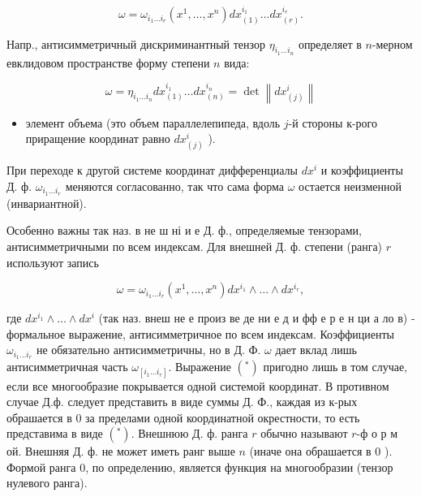 \documentclass[10pt]{article}
\begin{document}
\[

\omega=\omega_{i_{1} \ldots i_{r}}\left(x^{1}, \ldots, x^{n}\right) d x_{(1)}^{i_{1}} \ldots d x_{(r)}^{i_{r}} .

\]



Напр., антисимметричный дискриминантный тензор $\eta_{i_{1} \ldots i_{n}}$ определяет в $n$-мерном евклидовом пространстве форму степени $n$ вида:



\[

\omega=\eta_{i_{1} \ldots i_{n}} d x_{(1)}^{i_{1}} \ldots d x_{(n)}^{i_{n}}=\operatorname{det}\left\|d x_{(j)}^{i}\right\|

\]



\begin{itemize}

  \item элемент объема (это объем параллелепипеда, вдоль $j$-й стороны к-рого приращение координат равно $d x_{(j)}^{i}$ ).

\end{itemize}



При переходе к другой системе координат дифференциалы $d x^{i}$ и коэффициенты Д. ф. $\omega_{i_{1} \ldots i_{r}}$ меняются согласованно, так что сама форма $\omega$ остается неизменной (инвариантной).



Особенно важны так наз. в не ш ні и е Д. ф., определяемые тензорами, антисимметричными по всем индексам. Для внешней Д. ф. степени (ранга) $r$ используют запись



\[

\omega=\omega_{i_{1} \ldots i_{r}}\left(x^{1}, \ldots, x^{n}\right) d x^{i_{1}} \wedge \ldots \wedge d x^{i_{r}},

\]



где $d x^{i_{1}} \wedge \ldots \wedge d x^{i}$ (так наз. внеш не е произ ве де ни е д и фф е р е н ци а ло в) - формальное выражение, антисимметричное по всем индексам. Коэффициенты $\omega_{i_{1} \ldots i_{r}}$ не обязательно антисимметричны, но в Д. Ф. $\omega$ дает вклад лишь антисимметричная часть $\omega_{\left[i_{1} \ldots i_{r}\right]}$. Выражение $\left({ }^{*}\right)$ пригодно лишь в том случае, если все многообразие покрывается одной системой координат. В противном случае Д.ф. следует представить в виде суммы Д. Ф., каждая из к-рых обрашается в 0 за пределами одной координатной окрестности, то есть представима в виде $\left({ }^{*}\right)$. Внешнюю Д. ф. ранга $r$ обычно называют $r$-ф о р м ой. Внешняя Д. ф. не может иметь ранг выше $n$ (иначе она обрашается в 0 ). Формой ранга 0, по определению, является функция на многообразии (тензор нулевого ранга).
\end{document}
